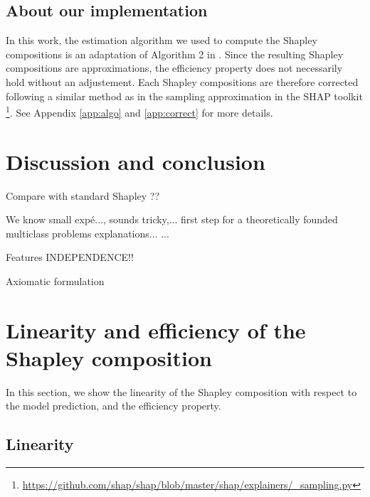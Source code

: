 \documentclass{article}
\theoremstyle{plain}
\theoremstyle{definition}
\theoremstyle{remark}
\begin{document}
\subsection{About our implementation}

In this work, the estimation algorithm we used to compute the Shapley compositions is an adaptation of Algorithm 2 in \cite{vstrumbelj2014explaining}. Since the resulting Shapley compositions are approximations, the efficiency property does not necessarily hold without an adjustement. Each Shapley compositions are therefore corrected following a similar method as in the sampling approximation in the SHAP toolkit \cite{NIPS2017_7062}\footnote{\url{https://github.com/shap/shap/blob/master/shap/explainers/_sampling.py}}. See Appendix \ref{app:algo} and \ref{app:correct} for more details.

\section{Discussion and conclusion}

Compare with standard Shapley ??

We know small expé..., sounds tricky,... first step for a theoretically founded multiclass problems explanations...
...

Features INDEPENDENCE!!

Axiomatic formulation


\nocite{langley00}





\newpage
\appendix
\onecolumn

\section{Linearity and efficiency of the Shapley composition}
\label{app:properties}
In this section, we show the linearity of the Shapley composition with respect to the model prediction, and the efficiency property.

\subsection{Linearity}
\end{document}
